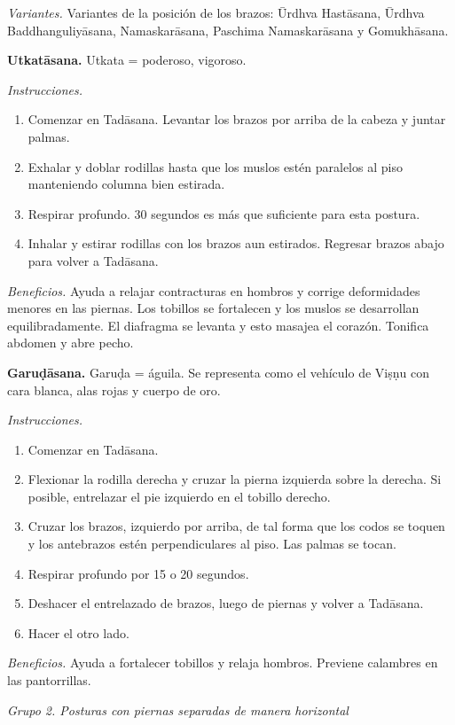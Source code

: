 \emph{Variantes.} Variantes de la posición de
los brazos: Ūrdhva Hastāsana, Ūrdhva
Baddhanguliyāsana, Namaskarāsana, Paschima
Namaskarāsana y Gomukhāsana.

\medskip\noindent\textbf{Utkatāsana.}
Utkata = poderoso, vigoroso.

\emph{Instrucciones.}
\begin{enumerate}
\item Comenzar en Tadāsana. Levantar los
brazos por arriba de la cabeza y juntar
palmas.
\item Exhalar y doblar rodillas hasta que los
muslos estén paralelos al piso manteniendo
columna bien estirada.
\item Respirar profundo. 30 segundos es más
que suficiente para esta postura.
\item Inhalar y estirar rodillas con los
brazos aun estirados. Regresar brazos abajo
para volver a Tadāsana.
\end{enumerate}

\emph{Beneficios.} Ayuda a relajar
contracturas en hombros y corrige
deformidades menores en las piernas. Los
tobillos se fortalecen y los muslos se
desarrollan equilibradamente. El diafragma se
levanta y esto masajea el corazón. Tonifica
abdomen y abre pecho.

\medskip\noindent\textbf{Garuḍāsana.}
Garuḍa = águila. Se representa como el
vehículo de Viṣṇu con cara blanca, alas rojas
y cuerpo de oro.

\emph{Instrucciones.}
\begin{enumerate}
\item Comenzar en Tadāsana.
\item Flexionar la rodilla derecha y cruzar
la pierna izquierda sobre la derecha. Si
posible, entrelazar el pie izquierdo en el
tobillo derecho.
\item Cruzar los brazos, izquierdo por
arriba, de tal forma que los codos se toquen
y los antebrazos estén perpendiculares al
piso. Las palmas se tocan.
\item Respirar profundo por 15 o 20 segundos.
\item Deshacer el entrelazado de brazos,
luego de piernas y volver a Tadāsana.
\item Hacer el otro lado.
\end{enumerate}

\emph{Beneficios.} Ayuda a fortalecer
tobillos y relaja hombros. Previene calambres
en las pantorrillas.

\medskip\noindent\emph{Grupo 2. Posturas con
piernas separadas de manera horizontal}

